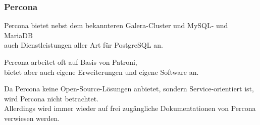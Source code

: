 
\begin{flushleft}
    \subsubsection{Percona}
    Percona bietet nebst dem bekannteren Galera-Cluster und \Gls{MySQL}- und \Gls{MariaDB}\\
    auch Dienstleistungen \cite{WEM9KYAX} aller Art für PostgreSQL an.
\end{flushleft}
\begin{flushleft}
    Percona arbeitet oft auf Basis von Patroni,\\
    bietet aber auch eigene Erweiterungen und eigene Software an\cite{66AS3BU9}.
\end{flushleft}
\begin{flushleft}
    Da Percona keine Open-Source-Lösungen anbietet, sondern Service-orientiert ist,\\
    wird Percona nicht betrachtet.\\
    Allerdings wird immer wieder auf frei zugängliche Dokumentationen von Percona verwiesen werden.
\end{flushleft}